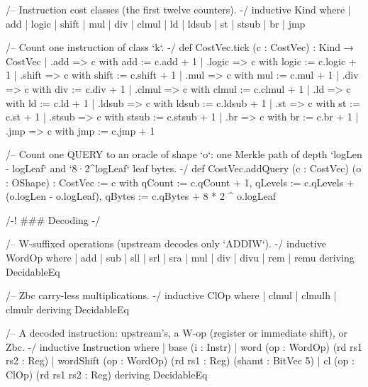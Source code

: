 \begin{leancode}[fontsize=\scriptsize,label={\footnotesize Contract/Machine.lean}]
/-- Instruction cost classes (the first twelve counters). -/
inductive Kind where
  | add | logic | shift | mul | div | clmul | ld | ldsub | st | stsub | br | jmp

/-- Count one instruction of class `k`. -/
def CostVec.tick (c : CostVec) : Kind → CostVec
  | .add => { c with add := c.add + 1 } | .logic => { c with logic := c.logic + 1 }
  | .shift => { c with shift := c.shift + 1 } | .mul => { c with mul := c.mul + 1 }
  | .div => { c with div := c.div + 1 } | .clmul => { c with clmul := c.clmul + 1 }
  | .ld => { c with ld := c.ld + 1 } | .ldsub => { c with ldsub := c.ldsub + 1 }
  | .st => { c with st := c.st + 1 } | .stsub => { c with stsub := c.stsub + 1 }
  | .br => { c with br := c.br + 1 } | .jmp => { c with jmp := c.jmp + 1 }

/-- Count one QUERY to an oracle of shape `o`: one Merkle path of depth `logLen - logLeaf` and
`8·2^logLeaf` leaf bytes. -/
def CostVec.addQuery (c : CostVec) (o : OShape) : CostVec :=
  { c with qCount := c.qCount + 1, qLevels := c.qLevels + (o.logLen - o.logLeaf),
           qBytes := c.qBytes + 8 * 2 ^ o.logLeaf }

/-! ### Decoding -/

/-- W-suffixed operations (upstream decodes only `ADDIW`). -/
inductive WordOp where
  | add | sub | sll | srl | sra | mul | div | divu | rem | remu
  deriving DecidableEq

/-- Zbc carry-less multiplications. -/
inductive ClOp where
  | clmul | clmulh | clmulr
  deriving DecidableEq

/-- A decoded instruction: upstream's, a W-op (register or immediate shift), or Zbc. -/
inductive Instruction where
  | base (i : Instr)
  | word (op : WordOp) (rd rs1 rs2 : Reg)
  | wordShift (op : WordOp) (rd rs1 : Reg) (shamt : BitVec 5)
  | cl (op : ClOp) (rd rs1 rs2 : Reg)
  deriving DecidableEq


\end{leancode}
